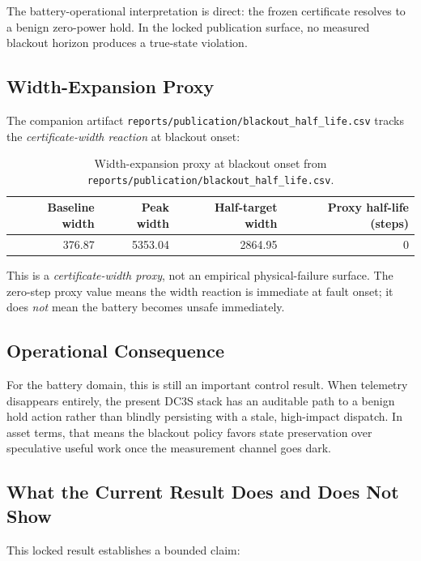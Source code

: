 The battery-operational interpretation is direct: the frozen
certificate resolves to a benign zero-power hold.  In the locked
publication surface, no measured blackout horizon produces a true-state
violation.

\subsection{Width-Expansion Proxy}

The companion artifact \texttt{reports/publication/blackout\_half\_life.csv}
tracks the \emph{certificate-width reaction} at blackout onset:

\begin{table}[ht]
\centering
\caption{Width-expansion proxy at blackout onset from
  \texttt{reports/publication/blackout\_half\_life.csv}.}
\label{tab:blackout-width-proxy}
\begin{tabular}{rrrr}
\toprule
\textbf{Baseline width} & \textbf{Peak width} & \textbf{Half-target width} &
  \textbf{Proxy half-life (steps)} \\
\midrule
376.87 & 5353.04 & 2864.95 & 0 \\
\bottomrule
\end{tabular}
\end{table}

This is a \emph{certificate-width proxy}, not an empirical physical-failure
surface.  The zero-step proxy value means the width reaction is immediate at
fault onset; it does \emph{not} mean the battery becomes unsafe immediately.

\subsection{Operational Consequence}

For the battery domain, this is still an important control result.  When
telemetry disappears entirely, the present DC3S stack has an auditable path
to a benign hold action rather than blindly persisting with a stale,
high-impact dispatch.  In asset terms, that means the blackout policy favors
state preservation over speculative useful work once the measurement channel
goes dark.

\subsection{What the Current Result Does and Does Not Show}

This locked result establishes a bounded claim:

